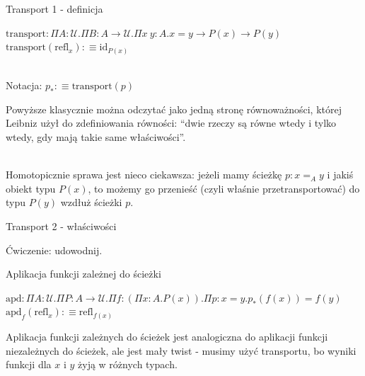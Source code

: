 \documentclass{beamer}
\newcommand{\defn}{:\equiv}
\newcommand{\U}{\mathcal{U}}
\newcommand{\refl}[1]{\text{refl}_{#1}}
\newcommand{\apd}[2]{\text{apd}_{#1}(#2)}
\begin{document}
\begin{frame}{Transport 1 - definicja}

\begin{definition}

$\text{transport} : \Pi A : \U. \Pi B : A \to \U. \Pi x\ y : A. x = y \to P(x) \to P(y)$ \\
$\text{transport}(\refl{x}) \defn \text{id}_{P(x)}$ \\~\

Notacja: $p_* \defn \text{transport}(p)$

\end{definition}

Powyższe klasycznie można odczytać jako jedną stronę równoważności, której Leibniz użył do zdefiniowania równości: ``dwie rzeczy są równe wtedy i tylko wtedy, gdy mają takie same właściwości''.\\~\

Homotopicznie sprawa jest nieco ciekawsza: jeżeli mamy ścieżkę $p : x =_A y$ i jakiś obiekt typu $P(x)$, to możemy go przenieść (czyli właśnie przetransportować) do typu $P(y)$ wzdłuż ścieżki $p$.

\end{frame}

\begin{frame}{Transport 2 - właściwości}


Ćwiczenie: udowodnij.

\end{frame}

\begin{frame}{Aplikacja funkcji zależnej do ścieżki}

\begin{definition}[Lemat 2.3.4]

$\text{apd} : \Pi A : \U. \Pi P : A \to \U. \Pi f : (\Pi x : A. P(x)). \Pi p : x = y. p_*(f(x)) = f(y)$ \\
$\apd{f}{\refl{x}} \defn \refl{f(x)}$

\end{definition}

Aplikacja funkcji zależnych do ścieżek jest analogiczna do aplikacji funkcji niezależnych do ścieżek, ale jest mały twist - musimy użyć transportu, bo wyniki funkcji dla $x$ i $y$ żyją w różnych typach.

\end{frame}
\end{document}
